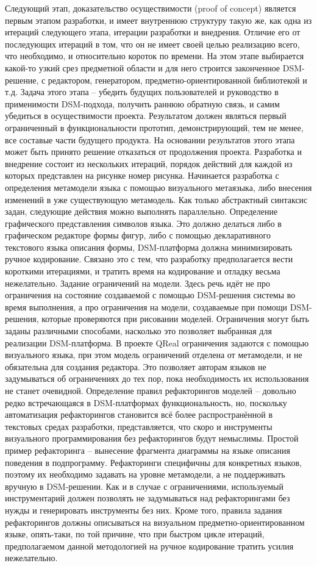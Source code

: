 	Следующий этап, доказательство осуществимости (proof of concept) является первым этапом разработки, и имеет внутреннюю структуру такую же, как одна из итераций следующего этапа, итерации разработки и внедрения. Отличие его от последующих итераций в том, что он не имеет своей целью реализацию всего, что необходимо, и относительно короток по времени. На этом этапе выбирается какой-то узкий срез предметной области и для него строится законченное DSM-решение, с редактором, генератором, предметно-ориентированной библиотекой и т.д. Задача этого этапа – убедить будущих пользователей и руководство в применимости DSM-подхода, получить раннюю обратную связь, и самим убедиться в осуществимости проекта. Результатом должен являться первый ограниченный в функциональности прототип, демонстрирующий, тем не менее, все составые части будущего продукта. На основании результатов этого этапа может быть принято решение отказаться от продолжения проекта.
	Разработка и внедрение состоит из нескольких итераций, порядок действий для каждой из которых представлен на рисунке номер рисунка. Начинается разработка с определения метамодели языка с помощью визуального метаязыка, либо внесения изменений в уже существующую метамодель. Как только абстрактный синтаксис задан, следующие действия можно выполнять параллельно.
Определение графического представления символов языка. Это должно делаться либо в графическом редакторе формы фигур, либо с помощью декларативного текстового языка описания формы, DSM-платформа должна минимизировать ручное кодирование. Связано это с тем, что разработку предполагается вести короткими итерациями, и тратить время на кодирование и отладку весьма нежелательно.
Задание ограничений на модели. Здесь речь идёт не про ограничения на состояние создаваемой с помощью DSM-решения системы во время выполнения, а про ограничения на модели, создаваемые при помощи DSM-решения, которые проверяются при рисовании моделей. Ограничения могут быть заданы различными способами, насколько это позволяет выбранная для реализации DSM-платформа. В проекте QReal ограничения задаются с помощью визуального языка, при этом модель ограничений отделена от метамодели, и не обязательна для создания редактора. Это позволяет авторам языков не задумываться об ограничениях до тех пор, пока необходимость их использования не станет очевидной.
Определение правил рефакторингов моделей – довольно редко встречающаяся в DSM-платформах функциональность, но, поскольку автоматизация рефакторингов становится всё более распространённой в текстовых средах разработки, представляется, что скоро и инструменты визуального программирования без рефакторингов будут немыслимы. Простой пример рефакторинга – вынесение фрагмента диаграммы на языке описания поведения в подпрограмму. Рефакторинги специфичны для конкретных языков, поэтому их необходимо задавать на уровне метамодели, а не поддерживать вручную в DSM-решении. Как и в случае с ограничениями, используемый инструментарий должен позволять не задумываться над рефакторингами без нужды и генерировать инструменты без них. Кроме того, правила задания рефакторингов должны описываться на визуальном предметно-ориентированном языке, опять-таки, по той причине, что при быстром цикле итераций, предполагаемом данной методологией на ручное кодирование тратить усилия нежелательно.
